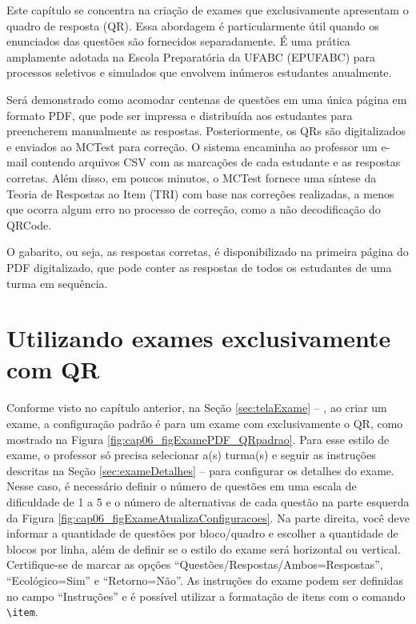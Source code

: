 \label{ch:examesQR}

Este capítulo se concentra na criação de exames que exclusivamente apresentam o quadro de resposta (QR). Essa abordagem é particularmente útil quando os enunciados das questões são fornecidos separadamente. É uma prática amplamente adotada na Escola Preparatória da UFABC (EPUFABC) para processos seletivos e simulados que envolvem inúmeros estudantes anualmente.

Será demonstrado como acomodar centenas de questões em uma única página em formato PDF, que pode ser impressa e distribuída aos estudantes para preencherem manualmente as respostas. Posteriormente, os QRs são digitalizados e enviados ao MCTest para correção. O sistema encaminha ao professor um e-mail contendo arquivos CSV com as marcações de cada estudante e as respostas corretas. Além disso, em poucos minutos, o MCTest fornece uma síntese da Teoria de Respostas ao Item (TRI) com base nas correções realizadas, a menos que ocorra algum erro no processo de correção, como a não decodificação do QRCode.

O gabarito, ou seja, as respostas corretas, é disponibilizado na primeira página do PDF digitalizado, que pode conter as respostas de todos os estudantes de uma turma em sequência.

\section{Utilizando exames exclusivamente com QR}\label{sec:examesQR}

Conforme visto no capítulo anterior, na Seção \ref{sec:telaExame} -- , ao criar um exame, a configuração padrão é para um exame com exclusivamente o QR, como mostrado na Figura \ref{fig:cap06_figExamePDF_QRpadrao}. Para esse estilo de exame, o professor só precisa selecionar a(s) turma(s) e seguir as instruções descritas na Seção \ref{sec:exameDetalhes} --  para configurar os detalhes do exame. Nesse caso, é necessário definir o número de questões em uma escala de dificuldade de 1 a 5 e o número de alternativas de cada questão na parte esquerda da Figura \ref{fig:cap06_figExameAtualizaConfiguracoes}. Na parte direita, você deve informar a quantidade de questões por bloco/quadro e escolher a quantidade de blocos por linha, além de definir se o estilo do exame será horizontal ou vertical. Certifique-se de marcar as opções ``Questões/Respostas/Ambos=Respostas'', ``Ecológico=Sim'' e ``Retorno=Não''. As instruções do exame podem ser definidas no campo ``Instruções'' e é possível utilizar a formatação de itens com o comando \verb|\item|. 


